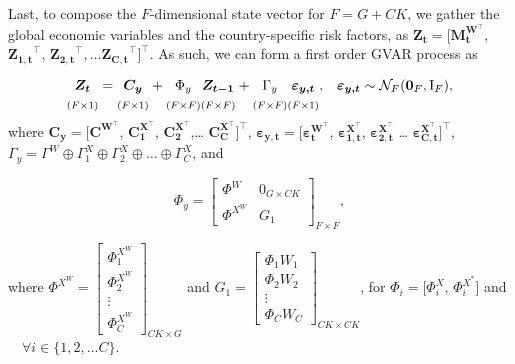 Last, to compose the \(F\)-dimensional state vector for \(F = G + CK\), we gather the global economic variables and the country-specific risk factors, as \(\boldsymbol{Z_t} = [\boldsymbol{M_{t}^{W^\top}}\), \(\boldsymbol{Z_{1,t}}^\top\), \(\boldsymbol{Z_{2,t}}^\top, \ldots    \boldsymbol{Z_{C,t}}^\top]^\top\). As such, we can form a first order GVAR process as
\begin{align}
    & \underset{(F \times 1)}{\vphantom{\Big|}
    \boldsymbol{Z_t}} =
    \underset{(F \times 1)}{\vphantom{\Big|}
    \boldsymbol{C_y}} +
    \underset{(F \times F)}{\vphantom{\Big|}
    \Phi_y}
    \underset{(F \times F)}{\vphantom{\Big|}
    \boldsymbol{Z_{t-1}}} +
    \underset{(F \times F)}{\vphantom{\Big|}
    \Gamma_y}
    \underset{(F \times 1)}{\vphantom{\Big|}
    \boldsymbol{\varepsilon_{y,t}}}\text{,} &
    \boldsymbol{\varepsilon_{y,t}} \sim {\mathcal{N}_F}(\boldsymbol{0}_F,\mathrm{I}_F)\text{,}  \label{eq:GVARequation}
\end{align}
where \(\boldsymbol{C_y} = [\boldsymbol{C^{W^\top}}\), \(\boldsymbol{C_1^{X^\top}}\), \(\boldsymbol{C_2^{X^\top}}\),\ldots{} \(\boldsymbol{C_C^{X^\top}}]^\top\), \(\boldsymbol{\varepsilon_{y,t}} =[ \boldsymbol{\varepsilon^{W^\top}_t}\), \(\boldsymbol{\varepsilon_{1,t}^{X^\top}}\), \(\boldsymbol{\varepsilon_{2,t}^{X^\top}}\) \ldots{} \(\boldsymbol{\varepsilon_{C,t}^{X^\top}}]^\top\), \(\Gamma_y=\Gamma^W \oplus \Gamma_1^X \oplus \Gamma_2^X \oplus \dots \oplus \Gamma_C^X\), and

\begin{equation}
\Phi_y =
\begin{bmatrix}
\Phi^W & 0_{\scriptscriptstyle{G \times CK}}  \\
\Phi^{X^{W}} & G_1
\end{bmatrix}_{F \times F} ,
\end{equation}

where \(\Phi^{X^{W}}=
\begin{bmatrix}
\Phi^{X^{W}}_1 \\
\Phi^{X^{W}}_2 \\
\vdots \\
\Phi^{X^{W}}_C
\end{bmatrix}_{CK \times G}\)
and \(G_1=
\begin{bmatrix}
\Phi_1W_1 \\
\Phi_2W_2 \\
\vdots \\
\Phi_CW_C
\end{bmatrix}_{CK \times CK}\), for \(\Phi_i= [\Phi_i^{X}\), \(\Phi_i^{X^*}]\) and \(\quad \forall i \in \{1,2, ...C \}\).

